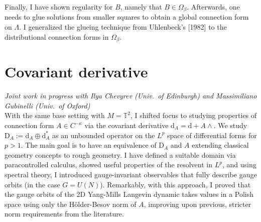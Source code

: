 \documentclass[12pt]{article}
\numberwithin{equation}{section}
\theoremstyle{definition}
\theoremstyle{remark}
\newcommand{\diff}{\mathrm{d}}
\newcommand{\1}{\mathbf 1}
\newcommand{\<}{\langle}
\renewcommand{\>}{\rangle}
\newcommand{\rmD}{\mathrm{D}}
\newcommand{\T}{\mathbb T}
\begin{document}
Finally, I have shown regularity for $B$, namely that $B\in\Omega_\beta$. Afterwards, one needs to glue solutions from smaller squares to obtain a global connection form on $\Lambda$. I generalized the glueing technique from Uhlenbeck's [1982] to the distributional connection forms in $\Omega_\beta$. 




\section{Covariant derivative}\label{sec:operator}
\vspace{-7pt}\textit{{\footnotesize Joint work in progress with Ilya Chevyrev (Univ.\ of Edinburgh) and Massimiliano Gubinelli (Univ.\ of Oxford)}}\\

\noindent With the same base setting with $M=\T^2$, I shifted focus to studying properties of connection form $A\in C^{-\kappa}$ via the covariant derivative $\diff_A = \diff + A\wedge $. We study $\rmD_A:=\diff_A\oplus\diff_A^*$ as an unbounded operator on the $L^p$  space of differential forms for $p>1$.  The main goal is to have an equivalence of $\rmD_A$ and $A$ extending classical geometry concepts to rough geometry. I have defined a suitable domain via paracontrolled calculus, showed useful properties of the resolvent in $L^p$, and using spectral theory, I introduced gauge-invariant observables that fully describe gauge orbits (in the case $G=U(N)$). Remarkably, with this approach, I proved that the gauge orbits of the 2D Yang-Mills Langevin dynamic takes values in a Polish space using only the H\"older-Besov norm of $A$, improving upon previous, stricter norm requirements from the literature. 





\end{document}
